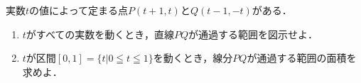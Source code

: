 \documentclass[../../main.tex]{subfiles}
\begin{document}
実数$t$の値によって定まる点$P(t+1,t)$と$Q(t-1,-t)$がある．
\begin{enumerate}
  \item $t$がすべての実数を動くとき，直線$PQ$が通過する範囲を図示せよ．
  \item $t$が区間$[0,1]=\{t|0 \leqq t \leqq1\}$を動くとき，線分$PQ$が通過する範囲の面積を求めよ．
\end{enumerate}
\end{document}
